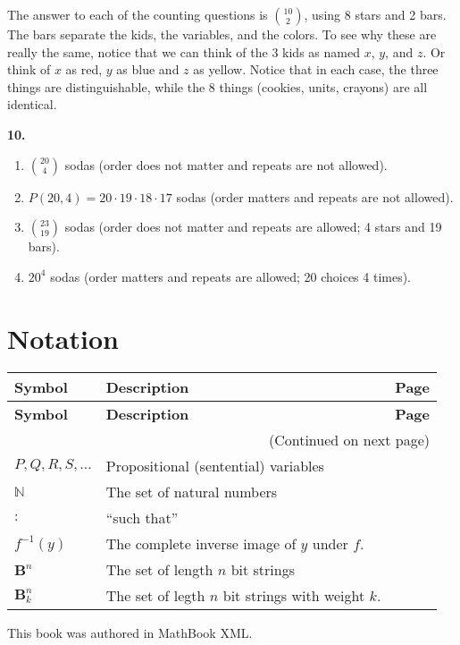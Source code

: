 \documentclass[10pt,]{book}
\theoremstyle{plain}
\theoremstyle{definition}
\theoremstyle{definition}
\theoremstyle{definition}
\numberwithin{equation}{section}
\def\N{\mathbb N}
\def\B{\mathbf{B}}
\def\inv{^{-1}}
\def\st{:}
\begin{document}
The answer to each of the counting questions is \({10 \choose 2}\), using 8 stars and 2 bars. The bars separate the kids, the variables, and the colors. To see why these are really the same, notice that we can think of the 3 kids as named \(x\), \(y\), and \(z\). Or think of \(x\) as red, \(y\) as blue and \(z\) as yellow. Notice that in each case, the three things are distinguishable, while the 8 things (cookies, units, crayons) are all identical.
%
\par\smallskip
\noindent\textbf{10.}\quad{}\leavevmode%
\begin{enumerate}[label=(\alph*)]
\item\hypertarget{li-604}{}\({20 \choose 4}\) sodas (order does not matter and repeats are not allowed).\item\hypertarget{li-605}{}\(P(20, 4) = 20\cdot 19\cdot 18 \cdot 17\) sodas (order matters and repeats are not allowed).\item\hypertarget{li-606}{}\({23 \choose 19}\) sodas (order does not matter and repeats are allowed; 4 stars and 19 bars).\item\hypertarget{li-607}{}\(20^4\) sodas (order matters and repeats are allowed; 20 choices 4 times).\end{enumerate}
\par\smallskip
\typeout{************************************************}
\typeout{************************************************}
\chapter[Notation]{Notation}\label{appendix-2}
\begin{longtable}[l]{llr}
\textbf{Symbol}&\textbf{Description}&\textbf{Page}\\[1em]
\endfirsthead
\textbf{Symbol}&\textbf{Description}&\textbf{Page}\\[1em]
\endhead
\multicolumn{3}{r}{(Continued on next page)}\\
\endfoot
\endlastfoot
$
                    P, Q, R, S, \ldots
                $&Propositional (sentential) variables&\pageref{notation-1}\\
$\N$&The set of natural numbers&\pageref{notation-2}\\
$\st$&``such that''&\pageref{notation-3}\\
$f\inv(y)$&The complete inverse image of \(y\) under \(f\).&\pageref{notation-4}\\
$\B^n$&The set of length \(n\) bit strings&\pageref{notation-5}\\
$\B^n_k$&The set of legth \(n\) bit strings with weight \(k\).&\pageref{notation-6}\\
\end{longtable}
%
\backmatter
%
%
\printindex
%
\cleardoublepage
\pagestyle{empty}
\centerline{
    This book was authored in MathBook XML.
}
\end{document}

